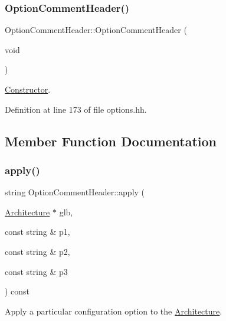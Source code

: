 \subsubsection{\texorpdfstring{OptionCommentHeader()}{OptionCommentHeader()}}
{\footnotesize\ttfamily Option\+Comment\+Header\+::\+Option\+Comment\+Header (\begin{DoxyParamCaption}\item[{void}]{ }\end{DoxyParamCaption})\hspace{0.3cm}{\ttfamily [inline]}}



\mbox{\hyperlink{class_constructor}{Constructor}}. 



Definition at line 173 of file options.\+hh.



\subsection{Member Function Documentation}
\mbox{\label{class_option_comment_header_a9020b0d5fab12d14a6fb309c5306bac7}} 
\subsubsection{\texorpdfstring{apply()}{apply()}}
{\footnotesize\ttfamily string Option\+Comment\+Header\+::apply (\begin{DoxyParamCaption}\item[{\mbox{\hyperlink{class_architecture}{Architecture}} $\ast$}]{glb,  }\item[{const string \&}]{p1,  }\item[{const string \&}]{p2,  }\item[{const string \&}]{p3 }\end{DoxyParamCaption}) const\hspace{0.3cm}{\ttfamily [virtual]}}



Apply a particular configuration option to the \mbox{\hyperlink{class_architecture}{Architecture}}. 

